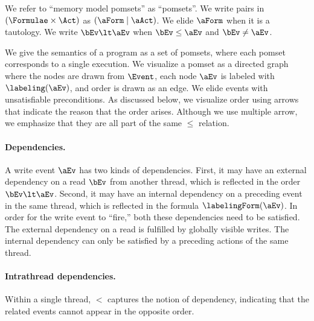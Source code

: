 We refer to ``memory model pomsets'' as ``{pomsets}''.
We write pairs in $(\Formulae\times\Act)$ as $(\aForm \mid \aAct)$.  We elide
$\aForm$ when it is a tautology.
We write $\bEv\lt\aEv$ when $\bEv\le\aEv$ and $\bEv\neq\aEv$.

We give the semantics of a program as a set of pomsets, where each pomset
corresponds to a single execution.  We visualize a pomset as a directed graph where
the nodes are drawn from $\Event$, each node $\aEv$ is labeled with
$\labeling(\aEv)$, and order is drawn as an edge.
We elide events with unsatisfiable preconditions.
As discussed below, we visualize order using 
arrows that indicate the reason that the order arises.  Although we use
multiple arrow, we emphasize that they are all part of the same $\le$ relation.

\paragraph{Dependencies.}
A write event $\aEv$ has two kinds of dependencies.  First, it may have an
external dependency on a read $\bEv$ from another thread, which is reflected
in the order $\bEv \lt \aEv$.  Second, it may have an internal dependency on
a preceding event in the same thread, which is reflected in the formula
$\labelingForm(\aEv)$.  In order for the write event to ``fire,'' both these
dependencies need to be satisfied.  The external dependency on a read is
fulfilled by globally visible writes.  The internal dependency can only be
satisfied by a preceding actions of the same thread.

\paragraph{Intrathread dependencies.}
Within a single thread, $\lt$ captures the notion of dependency,
indicating that the related events cannot appear in the opposite order.  

